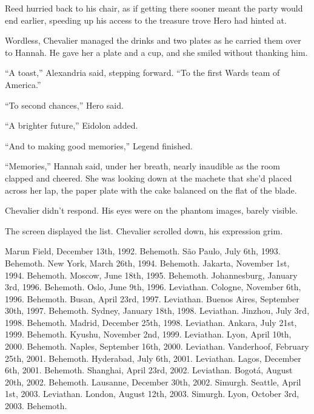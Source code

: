 Reed hurried back to his chair, as if getting there sooner meant the party would end earlier, speeding up his access to the treasure trove Hero had hinted at.



Wordless, Chevalier managed the drinks and two plates as he carried them over to Hannah.  He gave her a plate and a cup, and she smiled without thanking him.



``A toast,'' Alexandria said, stepping forward.  ``To the first Wards team of America.''



``To second chances,'' Hero said.



``A brighter future,'' Eidolon added.



``And to making good memories,'' Legend finished.



``Memories,'' Hannah said, under her breath, nearly inaudible as the room clapped and cheered.  She was looking down at the machete that she'd placed across her lap, the paper plate with the cake balanced on the flat of the blade.



Chevalier didn't respond.  His eyes were on the phantom images, barely visible.



\sectionbreak



The screen displayed the list.  Chevalier scrolled down, his expression grim.



Marun Field, December 13th, 1992.  Behemoth.
S\~{a}o Paulo, July 6th, 1993.  Behemoth.
New York, March 26th, 1994.  Behemoth.
Jakarta, November 1st, 1994.  Behemoth.
Moscow, June 18th, 1995.  Behemoth.
Johannesburg, January 3rd, 1996.  Behemoth.
Oslo, June 9th, 1996.  Leviathan.
Cologne, November 6th, 1996.  Behemoth.
Busan, April 23rd, 1997.  Leviathan.
Buenos Aires, September 30th, 1997.  Behemoth.
Sydney, January 18th, 1998.  Leviathan.
Jinzhou, July 3rd, 1998.  Behemoth.
Madrid, December 25th, 1998.  Leviathan.
Ankara, July 21st, 1999.  Behemoth.
Kyushu, November 2nd, 1999.  Leviathan.
Lyon, April 10th, 2000.  Behemoth.
Naples, September 16th, 2000.  Leviathan.
Vanderhoof, February 25th, 2001.  Behemoth.
Hyderabad, July 6th, 2001.  Leviathan.
Lagos, December 6th, 2001.  Behemoth.
Shanghai, April 23rd, 2002.  Leviathan.
Bogot\'{a}, August 20th, 2002.  Behemoth.
Lausanne, December 30th, 2002.  Simurgh.
Seattle, April 1st, 2003.  Leviathan.
London, August 12th, 2003.  Simurgh.
Lyon, October 3rd, 2003.  Behemoth.



